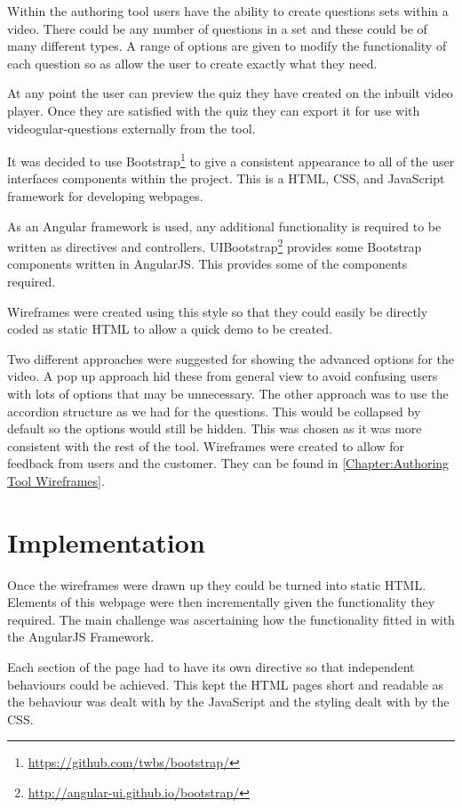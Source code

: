Within the authoring tool users have the ability to create questions sets within a video. There could be any number of questions in a set and these could be of many different types. A range of options are given to modify the functionality of each question so as allow the user to create exactly what they need.

At any point the user can preview the quiz they have created on the inbuilt video player. Once they are satisfied with the quiz they can export it for use with videogular-questions externally from the tool.

It was decided to use Bootstrap\footnote{\url{https://github.com/twbs/bootstrap/}} to give a consistent appearance to all of the user interfaces components within the project. This is a HTML, \gls{CSS}, and JavaScript framework for developing webpages.

As an Angular framework is used, any additional functionality is required to be written as directives and controllers. UIBootstrap\footnote{\url{http://angular-ui.github.io/bootstrap/}} provides some Bootstrap components written in \gls{AngularJS}. This provides some of the components required. 

Wireframes were created using this style so that they could easily be directly coded as static HTML to allow a quick demo to be created. 

Two different approaches were suggested for showing the advanced options for the video. A pop up approach hid these from general view to avoid confusing users with lots of options that may be unnecessary. The other approach was to use the accordion structure as we had for the questions. This would be collapsed by default so the options would still be hidden. This was chosen as it was more consistent with the rest of the tool. Wireframes were created to allow for feedback from users and the customer. They can be found in \autoref{Chapter:Authoring Tool Wireframes}.

\section{Implementation}
\label{Section:Authoring_Implementation}
Once the wireframes were drawn up they could be turned into static HTML. Elements of this webpage were then incrementally given the functionality they required. The main challenge was ascertaining how the functionality fitted in with the \gls{AngularJS} Framework. 

Each section of the page had to have its own directive so that independent behaviours could be achieved. This kept the HTML pages short and readable as the behaviour was dealt with by the JavaScript and the styling dealt with by the \gls{CSS}.

